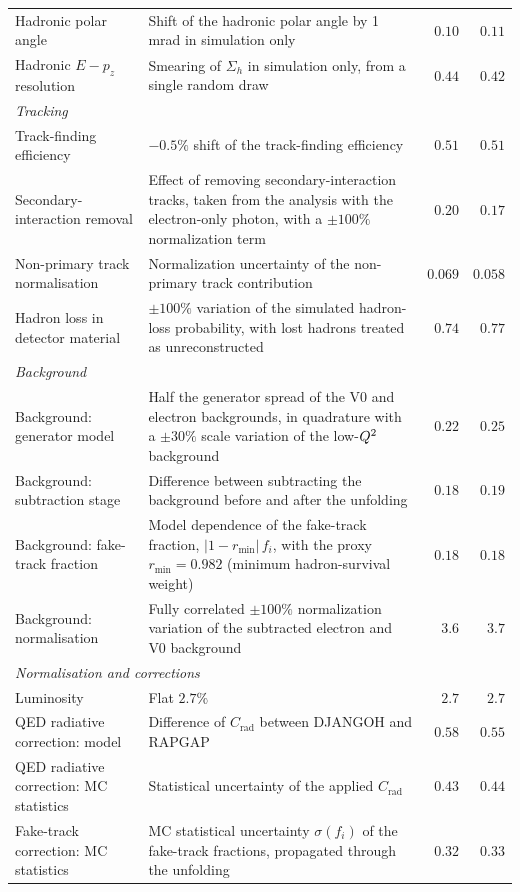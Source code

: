 \begin{table}[h]
\begin{tabular}{p{4.4cm}p{7.0cm}rr}
Hadronic polar angle & Shift of the hadronic polar angle by 1 mrad in simulation only & $0.10$ & $0.11$ \\
Hadronic $E-p_z$ resolution & Smearing of $\Sigma_h$ in simulation only, from a single random draw & $0.44$ & $0.42$ \\
\midrule
\multicolumn{4}{l}{\textit{Tracking}} \\
Track-finding efficiency & $-0.5\%$ shift of the track-finding efficiency & $0.51$ & $0.51$ \\
Secondary-interaction removal & Effect of removing secondary-interaction tracks, taken from the analysis with the electron-only photon, with a $\pm100\%$ normalization term & $0.20$ & $0.17$ \\
Non-primary track normalisation & Normalization uncertainty of the non-primary track contribution & $0.069$ & $0.058$ \\
Hadron loss in detector material & $\pm100\%$ variation of the simulated hadron-loss probability, with lost hadrons treated as unreconstructed & $0.74$ & $0.77$ \\
\midrule
\multicolumn{4}{l}{\textit{Background}} \\
Background: generator model & Half the generator spread of the V0 and electron backgrounds, in quadrature with a $\pm30\%$ scale variation of the low-$Q^{2}$ background & $0.22$ & $0.25$ \\
Background: subtraction stage & Difference between subtracting the background before and after the unfolding & $0.18$ & $0.19$ \\
Background: fake-track fraction & Model dependence of the fake-track fraction, $|1-r_{\min}|\,f_i$, with the proxy $r_{\min}=0.982$ (minimum hadron-survival weight) & $0.18$ & $0.18$ \\
Background: normalisation & Fully correlated $\pm100\%$ normalization variation of the subtracted electron and V0 background & $3.6$ & $3.7$ \\
\midrule
\multicolumn{4}{l}{\textit{Normalisation and corrections}} \\
Luminosity & Flat $2.7\%$ & $2.7$ & $2.7$ \\
QED radiative correction: model & Difference of $C_{\mathrm{rad}}$ between DJANGOH and RAPGAP & $0.58$ & $0.55$ \\
QED radiative correction: MC statistics & Statistical uncertainty of the applied $C_{\mathrm{rad}}$ & $0.43$ & $0.44$ \\
Fake-track correction: MC statistics & MC statistical uncertainty $\sigma(f_i)$ of the fake-track fractions, propagated through the unfolding & $0.32$ & $0.33$ \\

\end{tabular}
\end{table}
